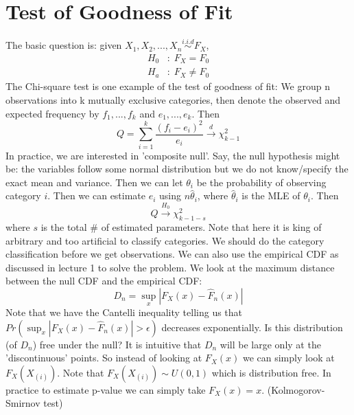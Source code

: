 \documentclass[twoside]{article}
\begin{document}
	\section{Test of Goodness of Fit}
	The basic question is: given $X_1, X_2, ..., X_n \stackrel{i.i.d}{\sim} F_X$, 
	\begin{align*}
		H_0 &: \; F_X = F_0 \\
		H_a &: \; F_X \neq F_0
	\end{align*}
	The Chi-square test is one example of the test of goodness of fit: We group n observations into k mutually exclusive categories, then denote the observed and expected frequency by $f_1, ..., f_k$ and $e_1, ..., e_k$. Then
	$$
	Q = \sum_{i=1}^k \frac{(f_i - e_i)^2}{e_i} \xrightarrow{d} \chi_{k-1}^2
	$$
	In practice, we are interested in 'composite null'. Say, the null hypothesis might be: the variables follow some normal distribution but we do not know/specify the exact mean and variance. Then we can let $\theta_i$ be the probability of observing category $i$. Then we can estimate $e_i$ using $n \hat{\theta}_i$, where $\hat{\theta}_i$ is the MLE of $\theta_i$. Then
	$$
	Q \xrightarrow{H_0} \chi_{k-1-s}^2
	$$
	where $s$ is the total \# of estimated parameters. Note that here it is king of arbitrary and too artificial to classify categories. We should do the category classification before we get observations. We can also use the empirical CDF as discussed in lecture 1 to solve the problem. We look at the maximum distance between the null CDF and the empirical CDF: 
	$$
	D_n = \sup_{x} |F_X (x) - \hat{F}_n (x)|
	$$
	Note that we have the Cantelli inequality telling us that $Pr \left( \sup_{x} |F_X (x) - \hat{F}_n (x)| > \epsilon \right)$ decreases exponentially. Is this distribution (of $D_n$) free under the null? It is intuitive that $D_n$ will be large only at the 'discontinuous' points. So instead of looking at $F_X(x)$ we can simply look at $F_X (X_{(i)})$. Note that $F_X (X_{(i)}) \sim U(0,1)$ which is distribution free. In practice to estimate p-value we can simply take $F_X(x) = x$. (Kolmogorov-Smirnov test)
	
\end{document}
